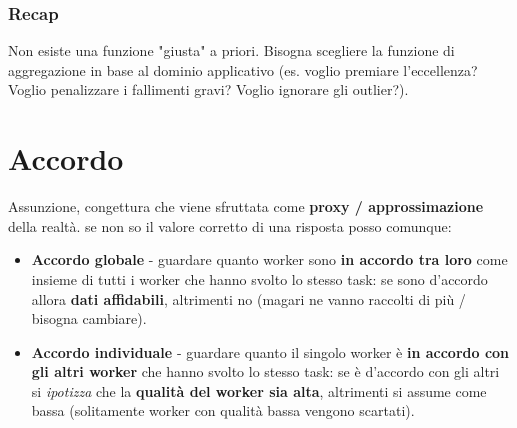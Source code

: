 \documentclass{article}
\begin{document}
    \subsubsection{Recap}
      Non esiste una funzione "giusta" a priori. Bisogna scegliere la funzione di aggregazione in base al dominio applicativo (es. voglio premiare l'eccellenza? Voglio penalizzare i fallimenti gravi? Voglio ignorare gli outlier?).
\section{Accordo}
  Assunzione, congettura che viene sfruttata come \textbf{proxy / approssimazione} della realtà. se non so il valore corretto di una risposta posso comunque:
  \begin{itemize}
      \item \textbf{Accordo globale} - guardare quanto worker sono \textbf{in accordo tra loro} come insieme di tutti i worker che hanno svolto lo stesso task: se sono d'accordo allora \textbf{dati affidabili}, altrimenti no (magari ne vanno raccolti di più / bisogna cambiare).
      \item \textbf{Accordo individuale} - guardare quanto il singolo worker è \textbf{in accordo con gli altri worker} che hanno svolto lo stesso task: se è d'accordo con gli altri si \textit{ipotizza} che la \textbf{qualità del worker sia alta}, altrimenti si assume come bassa (solitamente worker con qualità bassa vengono scartati).
  \end{itemize}
\end{document}
